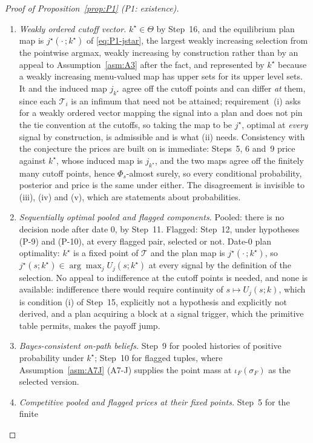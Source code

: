 \documentclass[11pt]{article}
\newcommand{\Tmap}{\mathcal{T}}
\begin{document}
\begin{proof}[Proof of Proposition~\ref{prop:P1} (P1: existence)]
\begin{enumerate}[label=(\roman*),leftmargin=2.4em,itemsep=3pt]
\item \emph{Weakly ordered cutoff vector.} $k^\star \in \Theta$ by Step~16, and the equilibrium plan
  map is $j^\star(\cdot\,;k^\star)$ of \eqref{eq:P1-jstar}, the largest weakly increasing selection
  from the pointwise argmax, weakly increasing by construction rather than by an appeal to
  Assumption~\ref{asm:A3} after the fact, and represented by $k^\star$ because a weakly increasing
  menu-valued map has upper sets for its upper level sets. It and the induced map $j_{k^\star}$ agree
  off the cutoff points and can differ \emph{at} them, since each $\Tmap_i$ is an infimum that need
  not be attained; requirement~(i) asks for a weakly ordered vector mapping the signal into a plan and
  does not pin the tie convention at the cutoffs, so taking the map to be $j^\star$, optimal at
  \emph{every} signal by construction, is admissible and is what (ii) needs. Consistency with the
  conjecture the prices are built on is immediate: Steps~5, 6 and~9 price against $k^\star$, whose
  induced map is $j_{k^\star}$, and the two maps agree off the finitely many cutoff points, hence
  $\Phi_s$-almost surely, so every conditional probability, posterior and price is the same under
  either. The disagreement is invisible to (iii), (iv) and (v), which are statements about
  probabilities.
\item \emph{Sequentially optimal pooled and flagged components.} Pooled: there is no decision node
  after date $0$, by Step~11. Flagged: Step~12, under hypotheses (P-9) and (P-10), at every flagged
  pair, selected or not. Date-$0$ plan optimality: $k^\star$ is a fixed point of $\Tmap$ and the plan
  map is $j^\star(\cdot\,;k^\star)$, so $j^\star(s;k^\star) \in \arg\max_j U_j(s;k^\star)$ at every
  signal by the definition of the selection. No appeal to indifference at the cutoff points is
  needed, and none is available: indifference there would require continuity of
  $s \mapsto U_j(s;k)$, which is condition (i) of Step~15, explicitly not a hypothesis and explicitly
  not derived, and a plan acquiring a block at a signal trigger, which the primitive table permits,
  makes the payoff jump.
\item \emph{Bayes-consistent on-path beliefs.} Step~9 for pooled histories of positive probability
  under $k^\star$; Step~10 for flagged tuples, where Assumption~\ref{asm:A7J} (A7-J) supplies the point mass
  at $\iota_F(\sigma_F)$ as the selected version.
\item \emph{Competitive pooled and flagged prices at their fixed points.} Step~5 for the finite

\end{enumerate}
\end{proof}
\end{document}
